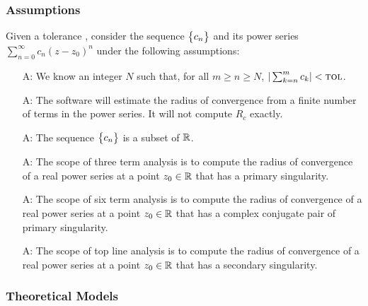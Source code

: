\documentclass[12pt]{article}
\newcounter{assumpnum} %
\begin{document}
\subsubsection{Assumptions} \label{sec_assumpt}

Given a tolerance \tol, consider the sequence $\bigl\{ {c_n} \bigr\}$ and its power series
$\sum_{n=0}^{\infty} c_n (z-z_0)^n$
under the following assumptions:

\begin{itemize}

\item[A\refstepcounter{assumpnum}\theassumpnum \label{as:n}:]
  We know an integer $N$ such that, for all $m \geq n \geq N$,
  $| \sum_{k=n}^{m} c_k | < \text{\sc tol}$.

\item[A\refstepcounter{assumpnum}\theassumpnum \label{as:approximate}:]
  The software  will estimate the radius of convergence from a finite number of terms
  in the power series. It will not compute $R_c$ exactly. 

\item[A\refstepcounter{assumpnum}\theassumpnum \label{as:real}:]
  The sequence $\bigl\{ {c_n} \bigr\}$ is a subset of $\mathbb{R}$.

\item[A\refstepcounter{assumpnum}\theassumpnum \label{as:threeterm}:]
  The scope of three term analysis is to compute the radius of convergence of
  a real power series at a point $z_0 \in \mathbb{R}$ that has a primary singularity.

\item[A\refstepcounter{assumpnum}\theassumpnum \label{as:sixterm}:]
  The scope of six term analysis is to compute the radius of convergence of
  a real power series at a point $z_0 \in \mathbb{R}$ that has a complex conjugate pair of
  primary singularity.

\item[A\refstepcounter{assumpnum}\theassumpnum \label{as:topline}:]
  The scope of top line analysis is to compute the radius of convergence of
  a real power series at a point $z_0 \in \mathbb{R}$ that has a secondary singularity.

\end{itemize}

\subsubsection{Theoretical Models}\label{sec_theoretical}
\label{ssc:TM}
\end{document}
